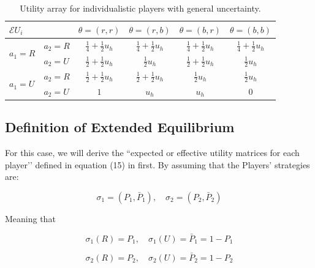 \documentclass{article}
\theoremstyle{definition}
\begin{document}
\begin{table}[H]
    \label{tab:UtilityGeneralUncertaintyIndividualistic}
\begin{center}
\renewcommand{\arraystretch}{1.3} %
\begin{tabular}{|l l|c c c c|}
\hline
\multirow{1}{*}{$\mathcal{E}U_i$} & & $\theta=(r,r)$ & $\theta=(r,b)$ & $\theta=(b,r)$ & $\theta=(b,b)$\\
\hline
\multirow{2}{*}{$a_1=R$}
  & $a_2=R$ &
  $\frac{1}{4} +  \frac{1}{2} u_h$ & 
  $\frac{1}{4} +  \frac{1}{2} u_h$ & 
  $\frac{1}{4} +  \frac{1}{2} u_h$ & 
  $\frac{1}{4} +  \frac{1}{2} u_h$\\
\cline{2-6}
  & $a_2=U$ &
  $\frac{1}{2} + \frac{1}{2} u_h$ & 
  $\frac{1}{2} u_h$ & 
  $\frac{1}{2} + \frac{1}{2} u_h$ & 
  $\frac{1}{2} u_h$\\
\hline
\multirow{2}{*}{$a_1=U$}
  & $a_2=R$ &
  $\frac{1}{2} + \frac{1}{2} u_h$ & 
  $\frac{1}{2} + \frac{1}{2} u_h$ & 
  $\frac{1}{2} u_h$ & 
  $\frac{1}{2} u_h$\\
\cline{2-6}
  & $a_2=U$ &
  $1$ & 
  $u_h$ & 
  $u_h$ & 
  $0$\\
\hline
\end{tabular}
\caption{Utility array for individualistic players with general uncertainty.}
\end{center}
\end{table}

\subsection{Definition of Extended Equilibrium}

For this case, we will derive the ``expected or effective utility matrices for each player’’ defined in equation (15) in \cite{arxiv:ExtendedEquilibrium} first.
By assuming that the Players’ strategies are:

\begin{equation}
    \sigma_1=(P_1,\bar{P}_1), \quad
    \sigma_2=(P_2,\bar{P}_2)
\end{equation}

Meaning that

\begin{equation}
    \sigma_1(R) = P_1, \quad \sigma_1(U) = \bar{P}_1 = 1-P_1
\end{equation}

\begin{equation}
    \sigma_2(R) = P_2, \quad \sigma_2(U) = \bar{P}_2 = 1-P_2
\end{equation}
\end{document}
